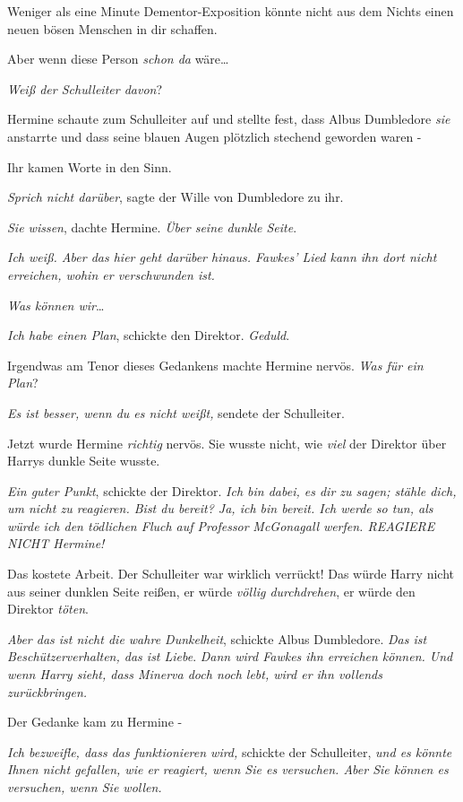 {Weniger als eine Minute Dementor-Exposition könnte nicht aus dem Nichts einen neuen bösen Menschen in dir schaffen.

Aber wenn diese Person \emph{schon da} wäre…

\emph{Weiß der Schulleiter davon}?

Hermine schaute zum Schulleiter auf und stellte fest, dass Albus Dumbledore \emph{sie} anstarrte und dass seine blauen Augen plötzlich stechend geworden waren -

Ihr kamen Worte in den Sinn.

\emph{Sprich nicht darüber}, sagte der Wille von Dumbledore zu ihr.

\emph{Sie wissen}, dachte Hermine. \emph{Über seine dunkle Seite}.

\emph{Ich weiß. Aber das hier geht darüber hinaus. Fawkes' Lied kann ihn dort nicht erreichen, wohin er verschwunden ist.}

\emph{Was können wir}…

\emph{Ich habe einen Plan}, schickte den Direktor. \emph{Geduld}.

Irgendwas am Tenor dieses Gedankens machte Hermine nervös. \emph{Was für ein Plan}?

\emph{Es ist besser, wenn du es nicht weißt,} sendete der Schulleiter.

Jetzt wurde Hermine \emph{richtig} nervös. Sie wusste nicht, wie \emph{viel} der Direktor über Harrys dunkle Seite wusste.

\emph{Ein guter Punkt}, schickte der Direktor. \emph{Ich bin dabei, es dir zu sagen; stähle dich, um nicht zu reagieren. Bist du bereit? Ja, ich bin bereit. Ich werde so tun, als würde ich den tödlichen Fluch auf Professor} \emph{McGonagall} \emph{werfen. REAGIERE NICHT Hermine!}

Das kostete Arbeit. Der Schulleiter war wirklich verrückt! Das würde Harry nicht aus seiner dunklen Seite reißen, er würde \emph{völlig durchdrehen}, er würde den Direktor \emph{töten}.

\emph{Aber das ist nicht die wahre Dunkelheit}, schickte Albus Dumbledore. \emph{Das ist Beschützerverhalten, das ist Liebe}. \emph{Dann wird Fawkes ihn erreichen können. Und wenn Harry sieht, dass Minerva doch noch lebt, wird er ihn vollends zurückbringen.}

Der Gedanke kam zu Hermine -

\emph{Ich bezweifle, dass das funktionieren wird,} schickte der Schulleiter, \emph{und es könnte Ihnen nicht gefallen, wie er reagiert, wenn Sie es versuchen. Aber Sie können es versuchen, wenn Sie wollen.}

}
